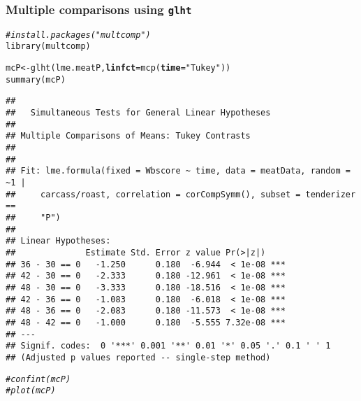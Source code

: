 \documentclass[color=usenames,dvipsnames]{beamer}\usepackage[]{graphicx}\usepackage[]{color}
\makeatletter
\newcommand{\hlstr}[1]{\textcolor[rgb]{0.749,0.012,0.012}{#1}}%
\newcommand{\hlcom}[1]{\textcolor[rgb]{0.514,0.506,0.514}{\textit{#1}}}%
\newcommand{\hlstd}[1]{\textcolor[rgb]{0,0,0}{#1}}%
\newcommand{\hlkwb}[1]{\textcolor[rgb]{0,0.341,0.682}{#1}}%
\newcommand{\hlkwc}[1]{\textcolor[rgb]{0,0,0}{\textbf{#1}}}%
\newcommand{\hlkwd}[1]{\textcolor[rgb]{0.004,0.004,0.506}{#1}}%
\newenvironment{kframe}{%
 \def\at@end@of@kframe{}%
 \ifinner\ifhmode%
  \def\at@end@of@kframe{\end{minipage}}%
  \begin{minipage}{\columnwidth}%
 \fi\fi%
 \def\FrameCommand##1{\hskip\@totalleftmargin \hskip-\fboxsep
 \colorbox{shadecolor}{##1}\hskip-\fboxsep
     \hskip-\linewidth \hskip-\@totalleftmargin \hskip\columnwidth}%
 \MakeFramed {\advance\hsize-\width
   \@totalleftmargin\z@ \linewidth\hsize
   \@setminipage}}%
 {\par\unskip\endMakeFramed%
 \at@end@of@kframe}
\newenvironment{knitrout}{}{} %
\newcommand{\inr}[1]{\colorbox{inlinecolor}{\texttt{#1}}}
\makeatother
\begin{document}
\begin{frame}[fragile]
  \frametitle{Multiple comparisons using {\tt glht}}
\scriptsize %
\begin{knitrout}\tiny
{}\color{fgcolor}\begin{kframe}
\begin{alltt}
\hlcom{# install.packages("multcomp")}
\hlkwd{library}\hlstd{(multcomp)}
\end{alltt}


{\ttfamily\noindent\itshape\color{messagecolor}{\#\# Loading required package: mvtnorm}}

{\ttfamily\noindent\itshape\color{messagecolor}{\#\# Loading required package: survival}}

{\ttfamily\noindent\itshape\color{messagecolor}{\#\# Loading required package: TH.data}}

{\ttfamily\noindent\itshape\color{messagecolor}{\#\# Loading required package: MASS}}

{\ttfamily\noindent\itshape\color{messagecolor}{\#\# \\\#\# Attaching package: 'TH.data'}}

{\ttfamily\noindent\itshape\color{messagecolor}{\#\# The following object is masked from 'package:MASS':\\\#\# \\\#\#\ \ \ \  geyser}}\begin{alltt}
\hlstd{mcP} \hlkwb{<-} \hlkwd{glht}\hlstd{(lme.meatP,} \hlkwc{linfct}\hlstd{=}\hlkwd{mcp}\hlstd{(}\hlkwc{time}\hlstd{=}\hlstr{"Tukey"}\hlstd{))}
\hlkwd{summary}\hlstd{(mcP)}
\end{alltt}
\begin{verbatim}
## 
## 	 Simultaneous Tests for General Linear Hypotheses
## 
## Multiple Comparisons of Means: Tukey Contrasts
## 
## 
## Fit: lme.formula(fixed = Wbscore ~ time, data = meatData, random = ~1 | 
##     carcass/roast, correlation = corCompSymm(), subset = tenderizer == 
##     "P")
## 
## Linear Hypotheses:
##              Estimate Std. Error z value Pr(>|z|)    
## 36 - 30 == 0   -1.250      0.180  -6.944  < 1e-08 ***
## 42 - 30 == 0   -2.333      0.180 -12.961  < 1e-08 ***
## 48 - 30 == 0   -3.333      0.180 -18.516  < 1e-08 ***
## 42 - 36 == 0   -1.083      0.180  -6.018  < 1e-08 ***
## 48 - 36 == 0   -2.083      0.180 -11.573  < 1e-08 ***
## 48 - 42 == 0   -1.000      0.180  -5.555 7.32e-08 ***
## ---
## Signif. codes:  0 '***' 0.001 '**' 0.01 '*' 0.05 '.' 0.1 ' ' 1
## (Adjusted p values reported -- single-step method)
\end{verbatim}
\begin{alltt}
\hlcom{# confint(mcP)}
\hlcom{# plot(mcP)}
\end{alltt}
\end{kframe}
\end{knitrout}
\end{frame}
\end{document}
